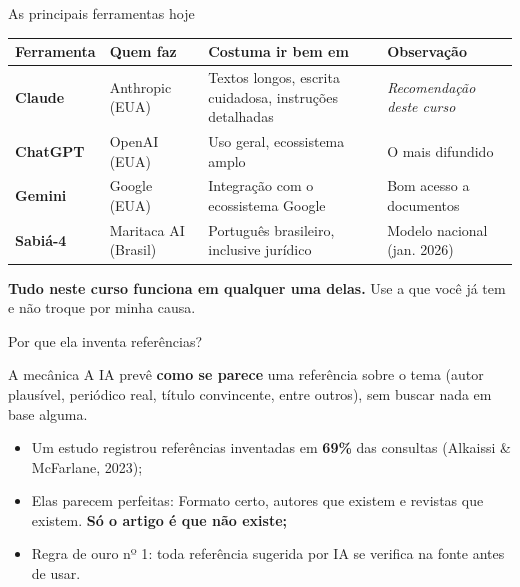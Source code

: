 \documentclass[11pt,aspectratio=169,t]{beamer}
\begin{document}
\begin{frame}{As principais ferramentas hoje}
  \scriptsize
  \begin{tabular}{p{2.0cm} p{2.0cm} p{3.6cm} p{3.6cm}}
    \toprule
    \textbf{Ferramenta} & \textbf{Quem faz} & \textbf{Costuma ir bem em} & \textbf{Observação} \\
    \midrule
    \textbf{Claude} & Anthropic (EUA) & Textos longos, escrita cuidadosa, instruções detalhadas & \textit{Recomendação deste curso} \\
    \addlinespace
    \textbf{ChatGPT} & OpenAI (EUA) & Uso geral, ecossistema amplo & O mais difundido \\
    \addlinespace
    \textbf{Gemini} & Google (EUA) & Integração com o ecossistema Google & Bom acesso a documentos \\
    \addlinespace
    \textbf{Sabiá-4} & Maritaca AI (Brasil) & Português brasileiro, inclusive jurídico & Modelo nacional (jan. 2026) \\
    \bottomrule
  \end{tabular}
  \pause
  \vspace{0.2cm}
  \begin{exampleblock}{}
    \centering \textbf{Tudo neste curso funciona em qualquer uma delas.} Use a que você já tem e não troque por minha causa.
  \end{exampleblock}
\end{frame}
\begin{frame}{Por que ela inventa referências?}
  \begin{alertblock}{A mecânica}
    A IA prevê \textbf{como se parece} uma referência sobre o tema (autor plausível, periódico real, título convincente, entre outros), sem buscar nada em base alguma.
  \end{alertblock}
  \pause
  \vfill
  \begin{itemize}
    \item Um estudo registrou referências inventadas em \textbf{69\%} das consultas (Alkaissi \& McFarlane, 2023);
    \item Elas parecem perfeitas: Formato certo, autores que existem e revistas que existem. \textbf{Só o artigo é que não existe;}
    \pause
    \item \alert{Regra de ouro nº 1}: toda referência sugerida por IA se verifica na fonte antes de usar.
  \end{itemize}
\end{frame}
\end{document}
